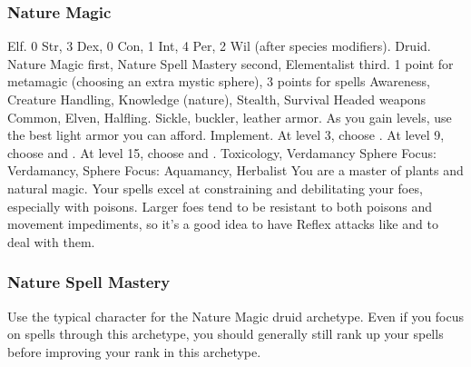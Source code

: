         \subsubsection{Nature Magic}
             Elf.
             0 Str, 3 Dex, 0 Con, 1 Int, 4 Per, 2 Wil (after species modifiers).
             Druid.
             Nature Magic first, Nature Spell Mastery second, Elementalist third.
             1 point for metamagic (choosing an extra mystic sphere), 3 points for spells
             Awareness, Creature Handling, Knowledge (nature), Stealth, Survival
             Headed weapons
             Common, Elven, Halfling.
             Sickle, buckler, leather armor. As you gain levels, use the best light armor you can afford.
             Implement.
                At level 3, choose .
                At level 9, choose  and .
                At level 15, choose  and .
             Toxicology, Verdamancy
             Sphere Focus: Verdamancy, Sphere Focus: Aquamancy, Herbalist
             You are a master of plants and natural magic.
            Your spells excel at constraining and debilitating your foes, especially with poisons.
            Larger foes tend to be resistant to both poisons and movement impediments, so it's a good idea to have Reflex attacks like  and  to deal with them.

        \subsubsection{Nature Spell Mastery}
            Use the typical character for the Nature Magic druid archetype.
            Even if you focus on spells through this archetype, you should generally still rank up your spells before improving your rank in this archetype.

